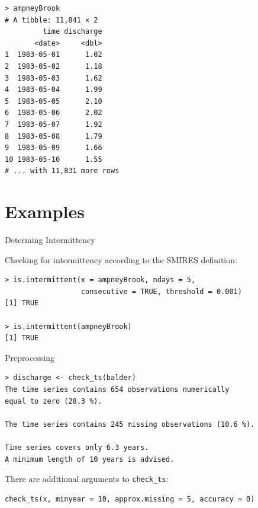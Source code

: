 \documentclass[xetex, german]{beamer}
\begin{document}
\begin{frame}[fragile]
	\begin{verbatim}
> ampneyBrook
# A tibble: 11,841 × 2
         time discharge
       <date>     <dbl>
1  1983-05-01      1.02
2  1983-05-02      1.18
3  1983-05-03      1.62
4  1983-05-04      1.99
5  1983-05-05      2.10
6  1983-05-06      2.02
7  1983-05-07      1.92
8  1983-05-08      1.79
9  1983-05-09      1.66
10 1983-05-10      1.55
# ... with 11,831 more rows
\end{verbatim}
\end{frame}

\section{Examples}

\begin{frame}[fragile]{Determing Intermittency}
	
	Checking for intermittency according to the SMIRES definition:
\begin{verbatim}
> is.intermittent(x = ampneyBrook, ndays = 5, 
                  consecutive = TRUE, threshold = 0.001)
[1] TRUE

> is.intermittent(ampneyBrook)
[1] TRUE
\end{verbatim}
\end{frame}


\begin{frame}[fragile]{Preprocessing}

\begin{verbatim}	
> discharge <- check_ts(balder)
The time series contains 654 observations numerically 
equal to zero (28.3 %).

The time series contains 245 missing observations (10.6 %).

Time series covers only 6.3 years. 
A minimum length of 10 years is advised.
\end{verbatim}

There are additional arguments to \verb|check_ts|:
	\small
\begin{verbatim}
check_ts(x, minyear = 10, approx.missing = 5, accuracy = 0)
\end{verbatim}	
\end{frame}
\end{document}
